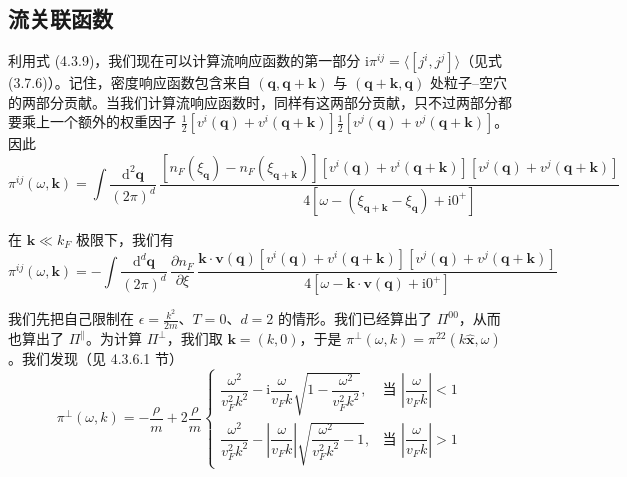 \subsection{流关联函数}

利用式 (4.3.9)，我们现在可以计算流响应函数的第一部分 $\mathrm{i}\pi^{ij}=\langle[j^i,j^j]\rangle$（见式 (3.7.6)）。记住，密度响应函数包含来自 $(\pmb{q},\pmb{q}+\pmb{k})$ 与 $(\pmb{q}+\pmb{k},\pmb{q})$ 处粒子–空穴的两部分贡献。当我们计算流响应函数时，同样有这两部分贡献，只不过两部分都要乘上一个额外的权重因子 $\frac{1}{2}[v^i(\pmb{q})+v^i(\pmb{q}+\pmb{k})]\frac{1}{2}[v^j(\pmb{q})+v^j(\pmb{q}+\pmb{k})]$。因此
\begin{equation*}
\pi^{ij}(\omega,\pmb{k}) = \int \frac{\mathrm{d}^2\pmb{q}}{(2\pi)^d}\, \frac{\left[n_F(\xi_{\pmb{q}})-n_F(\xi_{\pmb{q}+\pmb{k}})\right]\left[v^i(\pmb{q})+v^i(\pmb{q}+\pmb{k})\right]\left[v^j(\pmb{q})+v^j(\pmb{q}+\pmb{k})\right]}{4\left[\omega-(\xi_{\pmb{q}+\pmb{k}}-\xi_{\pmb{q}})+\mathrm{i}0^{+}\right]}
\end{equation*}

在 $\pmb{k}\ll k_F$ 极限下，我们有
\begin{equation*}
\pi^{ij}(\omega,\pmb{k}) = -\int \frac{\mathrm{d}^d\pmb{q}}{(2\pi)^d}\, \frac{\partial n_F}{\partial\xi}\, \frac{\pmb{k}\cdot\pmb{v}(\pmb{q})\left[v^i(\pmb{q})+v^i(\pmb{q}+\pmb{k})\right]\left[v^j(\pmb{q})+v^j(\pmb{q}+\pmb{k})\right]}{4\left[\omega-\pmb{k}\cdot\pmb{v}(\pmb{q})+\mathrm{i}0^{+}\right]}
\end{equation*}

我们先把自己限制在 $\epsilon=\frac{k^2}{2m}$、$T=0$、$d=2$ 的情形。我们已经算出了 $\Pi^{00}$，从而也算出了 $\Pi^{\parallel}$。为计算 $\Pi^{\perp}$，我们取 $\pmb{k}=(k,0)$，于是 $\pi^{\perp}(\omega,k)=\pi^{22}(k\hat{\pmb{x}},\omega)$。我们发现（见 4.3.6.1 节）
\begin{equation*}
\pi^{\perp}(\omega,k) = -\frac{\rho}{m} + 2\frac{\rho}{m}
\left\{
\begin{array}{ll}
\dfrac{\omega^2}{v_F^2k^2} - \mathrm{i}\dfrac{\omega}{v_F k}\sqrt{1-\dfrac{\omega^2}{v_F^2k^2}}, & \text{当 } \left|\dfrac{\omega}{v_F k}\right|<1\\[4ex]
\dfrac{\omega^2}{v_F^2k^2} - \left|\dfrac{\omega}{v_F k}\right|\sqrt{\dfrac{\omega^2}{v_F^2k^2}-1}, & \text{当 } \left|\dfrac{\omega}{v_F k}\right|>1
\end{array}
\right.
\end{equation*}

